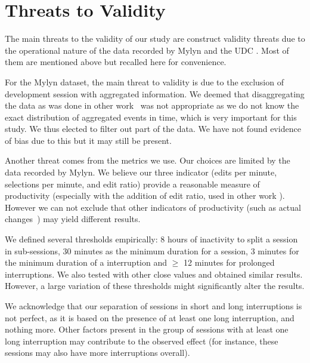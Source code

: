 \documentclass[times]{smrauth}
\begin{document}
\section{Threats to Validity}
The main threats to the validity of our study are construct validity threats due to the operational nature of the data recorded by Mylyn and the UDC \cite{M14}. Most of them are mentioned above but recalled here for convenience.

For the Mylyn dataset, the main threat to validity is due to the exclusion of development session with aggregated information. We deemed that disaggregating the data as was done in other work~\cite{YR11}  was not appropriate as we do not know the exact distribution of aggregated events in time, which is very important for this study. We thus elected to filter out part of the data. We have not found evidence of bias due to this but it may still be present.

Another threat comes from the metrics we use. Our choices are limited by the data recorded by Mylyn. We believe our three indicator (edits per minute, selections per minute, and edit ratio) provide a reasonable measure of productivity (especially with the addition of edit ratio, used in other work \cite{KM06}). However we can not exclude that other indicators of productivity (such as actual changes~\cite{RL10}) may yield different results.

We defined several thresholds empirically: 8 hours of inactivity to split a session in sub-sessions, 30 minutes as the minimum duration for a session, 3 minutes for the minimum duration of a interruption and  $\geq$ 12 minutes for prolonged interruptions. We also tested with other close values and obtained similar results. However, a large variation of these thresholds might significantly alter the results. 

We acknowledge that our separation of sessions in short and long interruptions is not perfect, as it is based on the presence of at least one long interruption, and nothing more. Other factors present in the group of sessions with at least one long interruption may contribute to the observed effect (for instance, these sessions may also have more interruptions overall).

\end{document}
